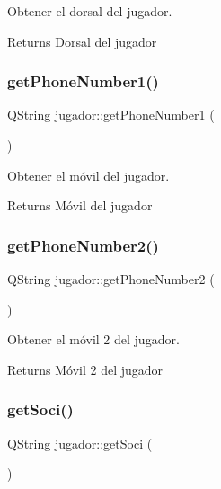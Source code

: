 Obtener el dorsal del jugador. 

\begin{DoxyReturn}{Returns}
Dorsal del jugador 
\end{DoxyReturn}
\mbox{\label{classjugador_a9bf1e0a307861344a0912d21ec4bf5a9}} 
\subsubsection{\texorpdfstring{get\+Phone\+Number1()}{getPhoneNumber1()}}
{\footnotesize\ttfamily Q\+String jugador\+::get\+Phone\+Number1 (\begin{DoxyParamCaption}{ }\end{DoxyParamCaption})}



Obtener el móvil del jugador. 

\begin{DoxyReturn}{Returns}
Móvil del jugador 
\end{DoxyReturn}
\mbox{\label{classjugador_aa6bbb640f9c687cebedcd442b96e5f76}} 
\subsubsection{\texorpdfstring{get\+Phone\+Number2()}{getPhoneNumber2()}}
{\footnotesize\ttfamily Q\+String jugador\+::get\+Phone\+Number2 (\begin{DoxyParamCaption}{ }\end{DoxyParamCaption})}



Obtener el móvil 2 del jugador. 

\begin{DoxyReturn}{Returns}
Móvil 2 del jugador 
\end{DoxyReturn}
\mbox{\label{classjugador_a03b468db718824916d7f6d47e46e708b}} 
\subsubsection{\texorpdfstring{get\+Soci()}{getSoci()}}
{\footnotesize\ttfamily Q\+String jugador\+::get\+Soci (\begin{DoxyParamCaption}{ }\end{DoxyParamCaption})}



